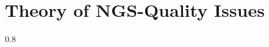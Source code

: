 \chapter[Theory]{Theory of NGS-Quality Issues}
\label{theory}


\begin{sparkline}{10}
  0.8
\end{sparkline}
